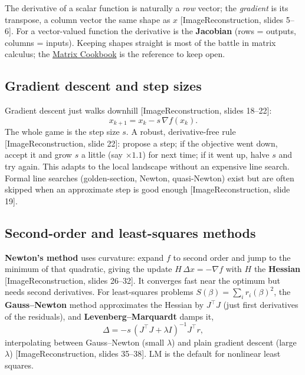 \documentclass[11pt]{article}
\newcommand{\deck}[1]{\textsf{\small[#1]}}
\begin{document}
\begin{notebox}
The derivative of a scalar function is naturally a \emph{row} vector; the
\emph{gradient} is its transpose, a column vector the same shape as $x$
\deck{ImageReconstruction, slides 5--6}. For a vector-valued function the
derivative is the \textbf{Jacobian} (rows = outputs, columns = inputs). Keeping
shapes straight is most of the battle in matrix calculus; the
\href{https://www.math.uwaterloo.ca/~hwolkowi/matrixcookbook.pdf}{Matrix
Cookbook} is the reference to keep open.
\end{notebox}

\subsection{Gradient descent and step sizes}

Gradient descent just walks downhill \deck{ImageReconstruction, slides 18--22}:
\[
x_{k+1} = x_k - s\,\nabla f(x_k).
\]
The whole game is the step size $s$. A robust, derivative-free rule
\deck{ImageReconstruction, slide 22}: propose a step; if the objective went
down, accept it and grow $s$ a little (say $\times 1.1$) for next time; if it
went up, halve $s$ and try again. This adapts to the local landscape without an
expensive line search. Formal line searches (golden-section, Newton,
quasi-Newton) exist but are often skipped when an approximate step is good
enough \deck{ImageReconstruction, slide 19}.

\subsection{Second-order and least-squares methods}

\textbf{Newton's method} uses curvature: expand $f$ to second order and jump to
the minimum of that quadratic, giving the update $H\,\Delta x = -\nabla f$ with
$H$ the \textbf{Hessian} \deck{ImageReconstruction, slides 26--32}. It converges
fast near the optimum but needs second derivatives. For least-squares problems
$S(\beta)=\sum_i r_i(\beta)^2$, the \textbf{Gauss--Newton} method approximates
the Hessian by $J^{\!\top}J$ (just first derivatives of the residuals), and
\textbf{Levenberg--Marquardt} damps it,
\[
\Delta = -s\,(J^{\!\top}J + \lambda I)^{-1} J^{\!\top} r,
\]
interpolating between Gauss--Newton (small $\lambda$) and plain gradient descent
(large $\lambda$) \deck{ImageReconstruction, slides 35--38}. LM is the default
for nonlinear least squares.
\end{document}
